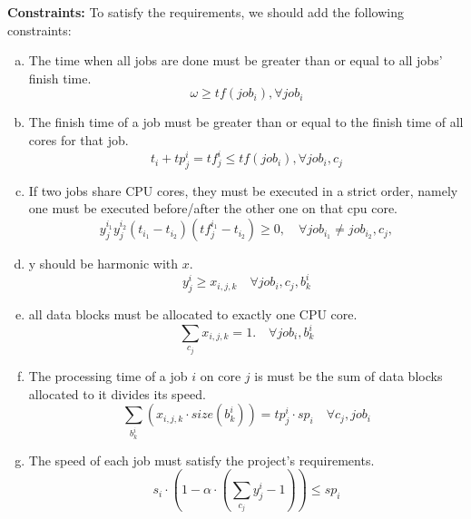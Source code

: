 \documentclass{llncs}
\begin{document}
\textbf{Constraints:} To satisfy the requirements, we should add the following constraints:
\begin{enumerate}[a.)]
    \item The time when all jobs are done must be greater than or equal to all jobs' finish time.
    \begin{equation}
        \omega \ge tf(job_i), \forall job_i
    \end{equation}
    
    \item The finish time of a job must be greater than or equal to the finish time of all cores for that job.
    \begin{equation}
        t_i + tp_j^i = tf_j^i \le tf(job_i), \forall job_i, c_j
    \end{equation}
    
    \item If two jobs share CPU cores, they must be executed in a strict order, namely one must be executed before/after the other one on that cpu core.
    \begin{equation}
        y_j^{i_1}y_j^{i_2} (t_{i_1} - t_{i_2})(tf_j^{i_1} - t_{i_2}) \ge 0, \quad \forall job_{i_1} \ne job_{i_2}, c_j, 
    \end{equation}
    
    \item y should be harmonic with $x$.
    \begin{equation}
        y_j^i \ge x_{i,j,k} \quad \forall job_i, c_j, b^i_k
    \end{equation}
    
    \item all data blocks must be allocated to exactly one CPU core.
    \begin{equation}
        \sum_{c_j} x_{i,j,k} = 1. \quad \forall job_i, b^i_k
    \end{equation}
    
    \item The processing time of a job $i$ on core $j$ is must be the sum of data blocks allocated to it divides its speed.
    \begin{equation}
        \sum_{b_k^i} (x_{i,j,k} \cdot size(b_k^i)) = tp_j^i \cdot sp_i \quad \forall c_j, job_i
    \end{equation}
    
    \item The speed of each job must satisfy the project's requirements.
    \begin{equation}
        s_i \cdot (1 - \alpha \cdot (\sum_{c_j}y_j^i - 1)) \le sp_i
    \end{equation}
\end{enumerate}
\end{document}
